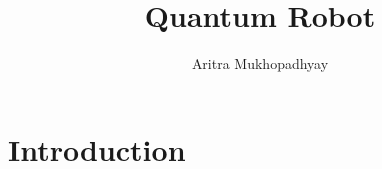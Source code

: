 \documentclass[12pt]{article}
\title{Quantum Robot}
\author{Aritra Mukhopadhyay}
\date{} %
\begin{document}
    

	

    \pagebreak
    \tableofcontents
    
	\pagebreak %
    \section{Introduction}
    
    
    
    
    
    
    
    
    \pagebreak %
    
    
\end{document}
